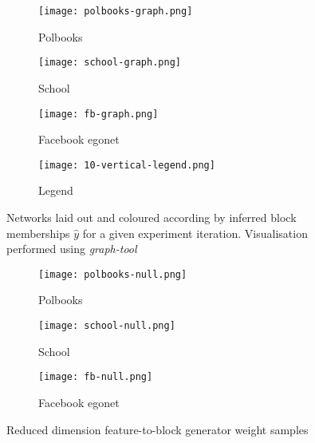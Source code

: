 \begin{figure}[!h]
	\centering
	\begin{subfigure}[t]{0.28\linewidth}
		\centering
		\texttt{[image: polbooks-graph.png]}
		\caption{Polbooks}
		\label{fig:polbooks-graph}
	\end{subfigure}
	\hfill
	\begin{subfigure}[t]{0.28\linewidth}
		\centering
		\texttt{[image: school-graph.png]}
		\caption{School}
		\label{fig:school-graph}
	\end{subfigure}
	\hfill
	\begin{subfigure}[t]{0.28\linewidth}
		\centering
		\texttt{[image: fb-graph.png]}
		\caption{Facebook egonet}
		\label{fig:fb-graph}
	\end{subfigure}
	\begin{subfigure}[t]{0.10\linewidth}
		\centering
		\texttt{[image: 10-vertical-legend.png]}
		\caption{Legend}
		\label{fig:10-legend}
	\end{subfigure}
	\caption{Networks laid out and coloured according by inferred block memberships $\hat{y}$ for a given experiment iteration. Visualisation performed using \textit{graph-tool} \cite{peixoto_graph-tool_2014}}
	\label{fig:graphs-all}
\end{figure}
\begin{figure}[!h]
	\centering
	\begin{subfigure}[t]{0.32\linewidth}
		\centering
		\vskip 0pt
		\texttt{[image: polbooks-null.png]}
		\caption{Polbooks}
		\label{fig:polbooks-null}
	\end{subfigure}
	\hfill
	\begin{subfigure}[t]{0.32\linewidth}
		\centering
		\vskip 0pt
		\texttt{[image: school-null.png]}
		\caption{School}
		\label{fig:school-null}
	\end{subfigure}
	\hfill
	\begin{subfigure}[t]{0.32\linewidth}
		\centering
		\vskip 0pt
		\texttt{[image: fb-null.png]}
		\caption{Facebook egonet}
		\label{fig:fb-null}
	\end{subfigure}
	\caption{Reduced dimension feature-to-block generator weight samples}
	\label{fig:null-all}
\end{figure}
